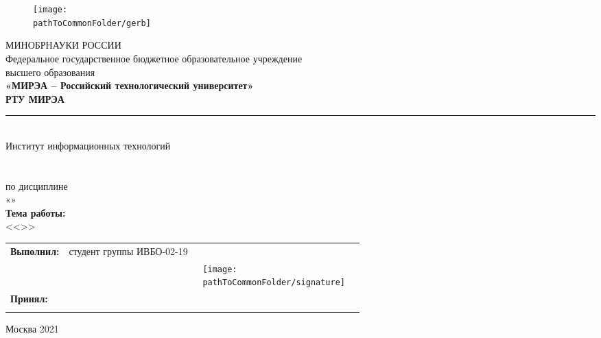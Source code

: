 
\begin{center}
	\begin{figure}[h!]
		\begin{center}
		\vspace{-10ex}
		\texttt{[image: \\pathToCommonFolder/gerb]}
		\end{center}	
	\end{figure}
 	\small	МИНОБРНАУКИ РОССИИ \\
	Федеральное государственное бюджетное образовательное учреждение\\
						высшего образования\\
\normalsize					
\textbf{«МИРЭА – Российский технологический университет»\\
						РТУ МИРЭА}\\
						\noindent\rule{1\linewidth}{1pt}\\
       Институт информационных технологий\\ %
					\kafedra\\
		\vspace{3ex}
			\large \textbf{\workname}  \\
						по дисциплине\\ «\discipline» \\
		\vspace{3ex}
		\if \withouttheme
			\textbf{Тема работы:}\\ <<\theme>>
		\fi
\vspace{6ex}
\small
\begin{table}[h!]
\begin{tabular}{lp{0.4\linewidth}p{0.2\linewidth}l}
	\textbf{Выполнил:} & студент группы ИВБО-02-19 & \\ 
	& & %
		\hfill \texttt{[image: \\pathToCommonFolder/signature]} &

	 \studentfio \\%
	\textbf{Принял:} & \rang & \\
	& & & \hfill \teacherfio\\
\end{tabular}
\end{table}
\end{center}

\normalsize
\begin{center}	
\vfill 
Москва 2021
\end{center}

